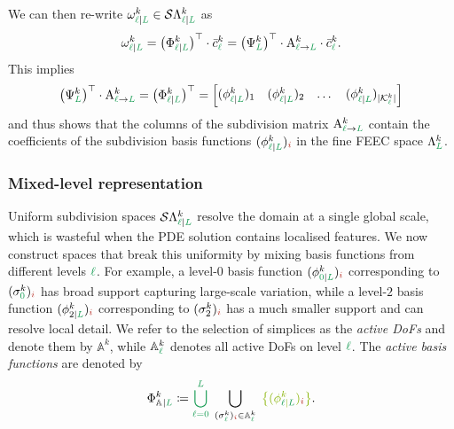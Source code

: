 \documentclass[a4paper, 12pt]{article}
\newcommand{\guidance}[1]{{\color{lime!70!black} #1}}
\newcommand{\green}{\color{ForestGreen}}
\newcommand{\brickred}{\color{BrickRed}}
\newcommand{\K}{\mathcal{K}}
\newcommand{\simplexname}{\sigma}
\newcommand{\simplex}[3]{\freeQ{\simplexname}{#1}{#2}{#3}}
\newcommand{\coarseIdxone}{{\brickred i}}
\renewcommand{\l}{{\green\ell}}
\renewcommand{\L}{{\green L}}
\newcommand{\lzero}{{\green 0}}
\newcommand{\constrQ}[5]{ ( {#1}^{#2}_{#3 \vert #4} )_{#5}} %
\newcommand{\constrVec}[4]{ {#1}^{#2}_{#3 \vert #4} }
\newcommand{\freeQ}[4]{ ( {#1}^{#2}_{#3} )_{#4}}
\newcommand{\freeVec}[3]{ {#1}^{#2}_{#3}}
\newcommand{\Amat}[3]{\mathbf{\mathrm{A}}^{#1}_{#2 \to #3}}
\newcommand{\FEECspace}[2]{\Lambda^{#1}_{#2}}
\newcommand{\FEECbases}{\Psi}
\newcommand{\SDFspace}[3]{\mathcal{S}\Lambda^{#1}_{#2 \vert #3}}
\newcommand{\SDFbasis}{\phi}
\newcommand{\SDFbases}{\Phi}
\newcommand{\activeDoFs}{\mathbb{A}}
\newcommand{\activeDoFSet}[2]{\activeDoFs^{#1}_{#2}}
\newcommand{\sumdimlk}[2]{\vert \K^{#2}_{#1} \vert}
\theoremstyle{definition}
\theoremstyle{plain}
\numberwithin{equation}{section}
\begin{document}
We can then re-write $\constrVec{\omega}{k}{\l}{\L} \in \SDFspace{k}{\l}{\L}$ as
\begin{equation}
    \constrVec{\omega}{k}{\l}{\L} = \big( \constrVec{\SDFbases}{k}{\l}{\L} \big)^\top \cdot \freeVec{\bar{c}}{k}{\l} = \big( \freeVec{\FEECbases}{k}{\L} \big)^\top \cdot \Amat{k}{\l}{\L} \cdot \freeVec{\bar{c}}{k}{\l}.
\end{equation}
This implies
\begin{equation}
    \big( \freeVec{\FEECbases}{k}{\L} \big)^\top \cdot \Amat{k}{\l}{\L} = \big( \constrVec{\SDFbases}{k}{\l}{\L} \big)^\top = \begin{bmatrix}
        \constrQ{\SDFbasis}{k}{\l}{\L}{1} & \constrQ{\SDFbasis}{k}{\l}{\L}{2} & \dots & \constrQ{\SDFbasis}{k}{\l}{\L}{\sumdimlk{\l}{k}}
    \end{bmatrix}
\end{equation}
and thus shows that the columns of the subdivision matrix $\Amat{k}{\l}{\L}$ contain the coefficients of the subdivision basis functions $\constrQ{\SDFbasis}{k}{\l}{\L}{\coarseIdxone}$ in the fine FEEC space $\FEECspace{k}{\L}$.

\subsubsection{Mixed-level representation}
\label{subsubsec:hierarchical_representation}

Uniform subdivision spaces $\SDFspace{k}{\l}{\L}$ resolve the domain at a single global scale, which is wasteful when the PDE solution contains localised features. We now construct spaces that break this uniformity by mixing basis functions from different levels $\l$. For example, a level-$0$ basis function $\constrQ{\SDFbasis}{k}{\lzero}{\L}{\coarseIdxone}$ corresponding to $\simplex{k}{\lzero}{\coarseIdxone}$ has broad support capturing large-scale variation, while a level-$2$ basis function $\constrQ{\SDFbasis}{k}{2}{\L}{\coarseIdxone}$ corresponding to $\simplex{k}{2}{\coarseIdxone}$ has a much smaller support and can resolve local detail. We refer to the selection of simplices as the \emph{active DoFs} and denote them by $\activeDoFSet{k}{}$, while $\activeDoFSet{k}{\l}$ denotes all active DoFs on level $\l$. The \emph{active basis functions} are denoted by
\begin{equation}
    \constrVec{\SDFbases}{k}{\activeDoFSet{}{}}{\L} \coloneq \bigcup\limits_{\l = \lzero}^\L \; \bigcup\limits_{\simplex{k}{\l}{\coarseIdxone} \in \activeDoFSet{k}{\l}} \; \guidance{\big\{ \constrQ{\SDFbasis}{k}{\l}{\L}{\coarseIdxone} \big\}}.
\end{equation}
\end{document}
